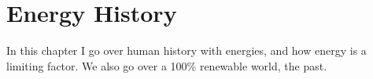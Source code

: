 \setchapterpreamble[u]{\margintoc}
\chapter{Energy History}

In this chapter I go over human history with energies, and how energy is a limiting factor. We also go over a 100\% renewable world, the past.